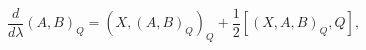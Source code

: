 \begin{equation}
\frac{d}{d\lambda}(A,B)_{Q}=(X,(A,B)_{Q})_{Q}+\frac{1}{2}[(X,A,B)_{Q}%
,Q],\label{1.18}%
\end{equation}


